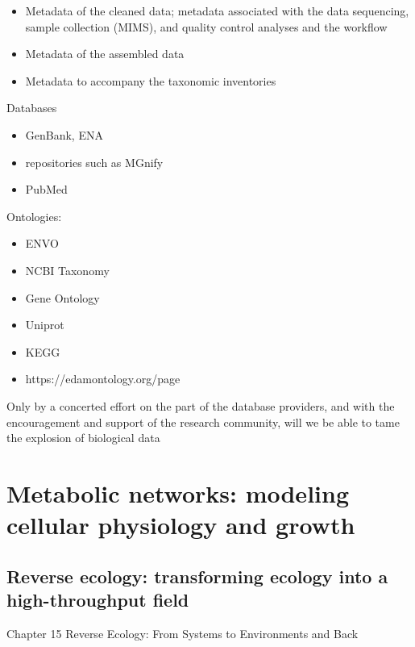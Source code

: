    


      \begin{itemize}
         \item Metadata of the cleaned data; metadata associated with the data sequencing, sample collection (MIMS), and quality control analyses and the workflow
         \item Metadata of the assembled data
         \item Metadata to accompany the taxonomic inventories

      \end{itemize}  


      Databases

      \begin{itemize}
         \item GenBank, ENA
         \item repositories such as MGnify 
         \item PubMed
      \end{itemize}


      Ontologies: 

      \begin{itemize}
         \item ENVO
         \item NCBI Taxonomy 
         \item Gene Ontology 
         \item Uniprot
         \item KEGG
         \item https://edamontology.org/page
      \end{itemize}
      \fi

      Only by a concerted effort on the part of the database providers, and with the encouragement and support of the research community, will we be able to tame the explosion of biological data



\section{Metabolic networks: modeling  cellular physiology and growth}


   \subsection{Reverse ecology: transforming ecology into a high-throughput field}

      Chapter 15
      Reverse Ecology: From Systems
      to Environments and Back

